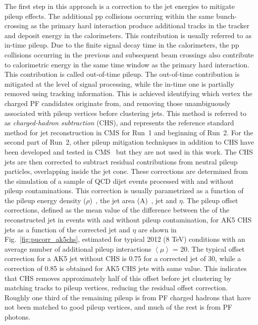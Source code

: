 The first step in this approach is a correction to the jet energies to mitigate pileup effects. The additional pp collisions occurring within the same bunch-crossing as the primary hard interaction produce additional tracks in the tracker and deposit energy in the calorimeters. This contribution is usually referred to as in-time pileup. Due to the finite signal decay time in the calorimeters, the pp collisions occurring in the previous and subsequent beam crossings also contribute to calorimetric energy in the same time window as the primary hard interaction. This contribution is called out-of-time pileup.
The out-of-time contribution is mitigated at the level of signal processing, while the in-time one is partially removed using tracking information. This is achieved identifying which vertex the charged PF candidates originate from, and removing those unambiguously associated with pileup vertices before clustering jets. This method is referred to as {\it charged-hadron subtraction} (CHS), and represents the reference standard method for jet reconstruction in CMS for Run~1 and beginning of Run~2. For the second part of Run~2, other pileup mitigation techniques in addition to CHS have been developed and tested in CMS~\cite{CMS-PAS-JME-13-005,CMS-PAS-JME-14-001,JME-16-003} but they are not used in this work. 
The CHS jets are then corrected to subtract residual contributions from neutral pileup particles, overlapping inside the jet cone. These corrections are determined from the simulation of a sample of QCD dijet events processed with and without pileup contaminations. This correction is usually parametrized as a function of the pileup energy density ($\rho$)~\cite{Cacciari:2011ma,Cacciari:2005hq}, the jet area (A)~\cite{Cacciari:2007fd}, jet \pt and $\eta$. The pileup offset corrections, defined as the mean value of the difference between the \pt of the reconstructed jet in events with and without pileup contamination, for AK5 CHS jets as a function of the corrected jet \pt and $\eta$ are shown in Fig.~\ref{fig:pucorr_ak5chs}, estimated for typical 2012 (8 TeV) conditions with an average number of additional pileup interactions $\left\langle\mu\right\rangle$ = 20.
The typical offset correction for a AK5 jet without CHS is 0.75 for a corrected jet \pt of 30\GeV, while a correction of 0.85 is obtained for AK5 CHS jets with same \pt value. This indicates that CHS removes approximately half of this offset before jet clustering by matching tracks to pileup vertices, reducing the residual offset correction. Roughly one third of the remaining pileup is from PF charged hadrons that have not been matched to good pileup vertices, and much of the rest is from PF photons. 

